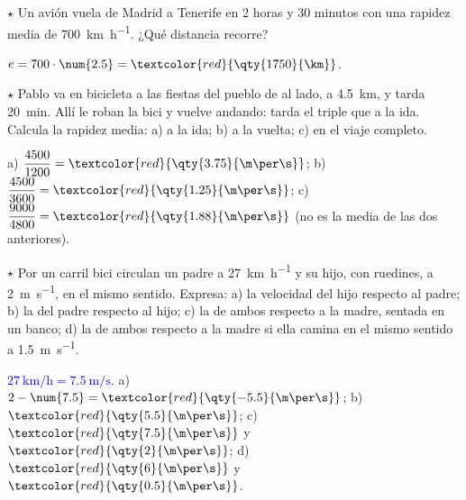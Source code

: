 \begin{exercise}
    \(\star\) Un avión vuela de Madrid a Tenerife en 2 horas y 30 minutos con una rapidez media de \qty{700}{\km\per\hour}. ¿Qué
    distancia recorre?
    \begin{solu}
        \(e = 700 \cdot \num{2.5} = \textcolor{red}{\qty{1750}{\km}}\).
    \end{solu}
\end{exercise}

\begin{exercise}
    \(\star\) Pablo va en bicicleta a las fiestas del pueblo de al lado, a \qty{4.5}{\km}, y tarda \qty{20}{\minute}. Allí le
    roban la bici y vuelve andando: tarda el triple que a la ida. Calcula la rapidez media: a) a la ida; b) a la vuelta; c) en el
    viaje completo.
    \begin{solu}
        a) \(\dfrac{4500}{1200} = \textcolor{red}{\qty{3.75}{\m\per\s}}\); b) \(\dfrac{4500}{3600} = \textcolor{red}{\qty{1.25}{\m\per\s}}\);
        c) \(\dfrac{9000}{4800} = \textcolor{red}{\qty{1.88}{\m\per\s}}\) (no es la media de las dos anteriores).
    \end{solu}
\end{exercise}

\begin{exercise}
    \(\star\) Por un carril bici circulan un padre a \qty{27}{\km\per\hour} y su hijo, con ruedines, a \qty{2}{\m\per\s}, en el
    mismo sentido. Expresa: a) la velocidad del hijo respecto al padre; b) la del padre respecto al hijo; c) la de ambos respecto
    a la madre, sentada en un banco; d) la de ambos respecto a la madre si ella camina en el mismo sentido a \qty{1.5}{\m\per\s}.
    \begin{solu}
        \textcolor{blue}{\(\qty{27}{\km\per\hour} = \qty{7.5}{\m\per\s}\).} a) \(2 - \num{7.5} = \textcolor{red}{\qty{-5.5}{\m\per\s}}\);
        b) \(\textcolor{red}{\qty{5.5}{\m\per\s}}\); c) \(\textcolor{red}{\qty{7.5}{\m\per\s}}\) y \(\textcolor{red}{\qty{2}{\m\per\s}}\);
        d) \(\textcolor{red}{\qty{6}{\m\per\s}}\) y \(\textcolor{red}{\qty{0.5}{\m\per\s}}\).
    \end{solu}
\end{exercise}

